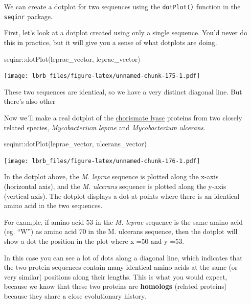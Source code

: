 \documentclass[
]{book}
\newenvironment{Shaded}{\begin{snugshade}}{\end{snugshade}}
\newcommand{\FunctionTok}[1]{\textcolor[rgb]{0.00,0.00,0.00}{#1}}
\newcommand{\NormalTok}[1]{#1}
\newcommand{\SpecialCharTok}[1]{\textcolor[rgb]{0.00,0.00,0.00}{#1}}
\begin{document}
We can create a dotplot for two sequences using the \texttt{dotPlot()} function in the \texttt{seqinr} package.

First, let's look at a dotplot created using only a single sequence. You'd never do this in practice, but it will give you a sense of what dotplots are doing.

\begin{Shaded}
\begin{Highlighting}[]
\NormalTok{seqinr}\SpecialCharTok{::}\FunctionTok{dotPlot}\NormalTok{(leprae\_vector, }
\NormalTok{                leprae\_vector)}
\end{Highlighting}
\end{Shaded}

\texttt{[image: lbrb\_files/figure-latex/unnamed-chunk-175-1.pdf]}

These two sequences are identical, so we have a very distinct diagonal line. But there's also other

Now we'll make a real dotplot of the \href{https://en.wikipedia.org/wiki/Chorismate_lyase}{chorismate lyase} proteins from two closely related species, \emph{Mycobacterium leprae} and \emph{Mycobacterium ulcerans}.

\begin{Shaded}
\begin{Highlighting}[]
\NormalTok{seqinr}\SpecialCharTok{::}\FunctionTok{dotPlot}\NormalTok{(leprae\_vector, }
\NormalTok{                ulcerans\_vector)}
\end{Highlighting}
\end{Shaded}

\texttt{[image: lbrb\_files/figure-latex/unnamed-chunk-176-1.pdf]}

In the dotplot above, the \emph{M. leprae} sequence is plotted along the x-axis (horizontal axis), and the \emph{M. ulcerans} sequence is plotted along the y-axis (vertical axis). The dotplot displays a dot at points where there is an identical amino acid in the two sequences.

For example, if amino acid 53 in the \emph{M. leprae} sequence is the same amino acid (eg. ``W'') as amino acid 70 in the M. ulcerans sequence, then the dotplot will show a dot the position in the plot where x =50 and y =53.

In this case you can see a lot of dots along a diagonal line, which indicates that the two protein sequences contain many identical amino acids at the same (or very similar) positions along their lengths. This is what you would expect, because we know that these two proteins are \textbf{homologs} (related proteins) because they share a close evolutionary history.
\end{document}
